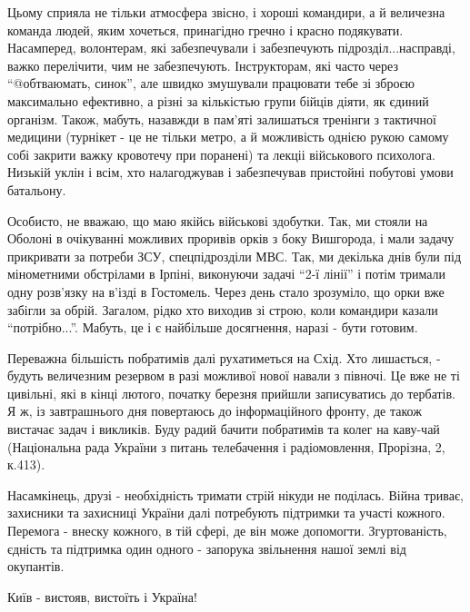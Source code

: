 Цьому сприяла не тільки атмосфера звісно, і хороші командири, а й величезна
команда людей, яким хочеться, принагідно гречно і красно подякувати.
Насамперед, волонтерам, які забезпечували і забезпечують підрозділ...насправді,
важко перелічити, чим не забезпечують. Інструкторам, які часто через
\enquote{@обтваюмать, синок}, але швидко змушували працювати тебе зі зброєю максимально
ефективно, а різні за кількістью групи бійців діяти, як єдиний організм. Також,
мабуть, назавжди в пам'яті залишаться тренінги з тактичної медицини (турнікет -
це не тільки метро, а й можливість однією рукою самому собі закрити важку
кровотечу при поранені) та лекціі військового психолога. Низькій уклін і всім,
хто налагоджував і забезпечував пристойні побутові умови батальону.

Особисто, не вважаю, що маю якійсь військові здобутки. Так, ми стояли на
Оболоні в очікуванні можливих проривів орків з боку Вишгорода, і мали задачу
прикривати за потреби ЗСУ, спецпідрозділи МВС. Так, ми декілька днів були під
мінометними обстрілами в Ірпіні, виконуючи задачі \enquote{2-ї лінії} і потім тримали
одну розв'язку на в'ізді в Гостомель. Через день стало зрозуміло, що орки вже
забігли за обрій. Загалом, рідко хто виходив зі строю, коли командири казали
\enquote{потрібно...}. Мабуть, це і є найбільше досягнення, наразі - бути готовим.

Переважна більшість побратимів далі рухатиметься на Схід. Хто лишається, -
будуть величезним резервом в разі можливої нової навали з півночі. Це вже не ті
цивільні, які в кінці лютого, початку березня прийшли записуватись до тербатів.
Я ж, із завтрашнього дня повертаюсь до інформаційного фронту, де також вистачає
задач і викликів. Буду радий бачити побратимів та колег на каву-чай
(Національна рада України з питань телебачення і радіомовлення, Прорізна, 2,
к.413).

Насамкінець, друзі - необхідність тримати стрій нікуди не поділась. Війна
триває, захисники та захисниці України далі потребують підтримки та участі
кожного. Перемога - внеску кожного, в тій сфері, де він може допомогти.
Згуртованість, єдність та підтримка один одного - запорука звільнення нашої
землі від окупантів. 

Київ - вистояв, вистоїть і Україна!

